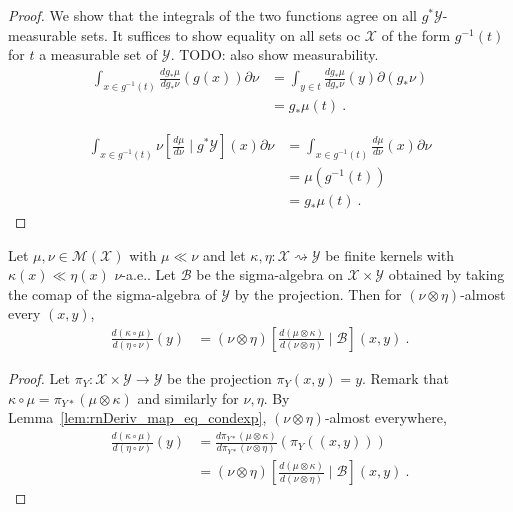 \begin{proof}\mathlibok
\uses{}
We show that the integrals of the two functions agree on all $g^* \mathcal Y$-measurable sets. It suffices to show equality on all sets oc $\mathcal X$ of the form $g^{-1}(t)$ for $t$ a measurable set of $\mathcal Y$.
TODO: also show measurability.
\begin{align*}
\int_{x \in g^{-1}(t)}\frac{d g_*\mu}{d g_*\nu}(g(x)) \partial\nu
&= \int_{y \in t}\frac{d g_*\mu}{d g_*\nu}(y) \partial(g_*\nu)
\\
&= g_*\mu (t)
\: .
\end{align*}

\begin{align*}
\int_{x \in g^{-1}(t)}\nu\left[ \frac{d \mu}{d \nu} \mid g^* \mathcal Y\right](x) \partial\nu
&= \int_{x \in g^{-1}(t)}\frac{d \mu}{d \nu}(x) \partial\nu
\\
&= \mu(g^{-1}(t))
\\
&= g_*\mu(t)
\: .
\end{align*}


\end{proof}


\begin{lemma}
  \label{lem:rnDeriv_comp_eq_condexp}
  \uses{}
  Let $\mu, \nu \in \mathcal M(\mathcal X)$ with $\mu \ll \nu$ and let $\kappa, \eta : \mathcal X \rightsquigarrow \mathcal Y$ be finite kernels with $\kappa(x) \ll \eta(x)$ $\nu$-a.e..
  Let $\mathcal B$ be the sigma-algebra on $\mathcal X \times \mathcal Y$ obtained by taking the comap of the sigma-algebra of $\mathcal Y$ by the projection.
  Then for $(\nu \otimes \eta)$-almost every $(x,y)$,
  \begin{align*}
  \frac{d(\kappa \circ \mu)}{d(\eta \circ \nu)}(y)
  &= (\nu \otimes \eta)\left[ \frac{d (\mu \otimes \kappa)}{d (\nu \otimes \eta)} \mid \mathcal B \right](x,y)
  \: .
  \end{align*}
\end{lemma}

\begin{proof}\leanok
{}
Let $\pi_Y : \mathcal X \times \mathcal Y \to \mathcal Y$ be the projection $\pi_Y(x,y) = y$.
Remark that $\kappa \circ \mu = \pi_{Y*}(\mu \otimes \kappa)$ and similarly for $\nu, \eta$.
By Lemma~\ref{lem:rnDeriv_map_eq_condexp}, $(\nu \otimes \eta)$-almost everywhere,
\begin{align*}
\frac{d(\kappa \circ \mu)}{d(\eta \circ \nu)}(y)
&= \frac{d \pi_{Y*}(\mu \otimes \kappa)}{d \pi_{Y*}(\nu \otimes \eta)}(\pi_Y((x,y)))
\\
&= (\nu \otimes \eta)\left[ \frac{d (\mu \otimes \kappa)}{d (\nu \otimes \eta)} \mid \mathcal B\right](x,y)
\: .
\end{align*}
\end{proof}



